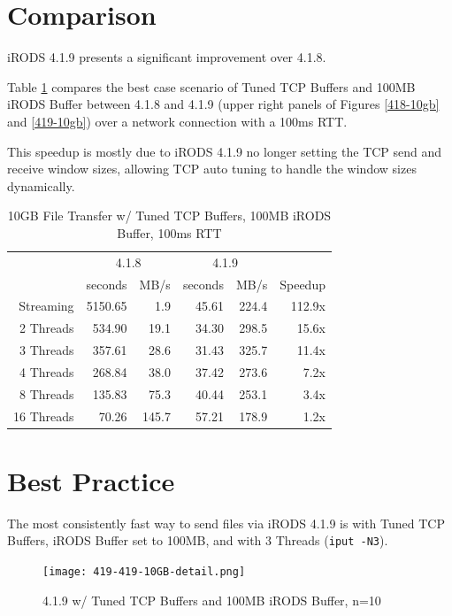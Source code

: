 \documentclass[letter, 11pt]{article}
\begin{document}
\clearpage
\section{Comparison}

iRODS 4.1.9 presents a significant improvement over 4.1.8.

Table \ref{speedup} compares the best case scenario of Tuned TCP Buffers and
100MB iRODS Buffer between 4.1.8 and 4.1.9 (upper right panels of Figures
\ref{418-10gb} and \ref{419-10gb}) over a network connection with a 100ms RTT.

This speedup is mostly due to iRODS 4.1.9 no longer setting the TCP send and receive window sizes, allowing TCP auto tuning
to handle the window sizes dynamically.

\begin{table}[h]
\centering
\begin{tabular}{r|rr|rr|r}
 & \multicolumn{2}{c}{4.1.8} & \multicolumn{2}{c}{4.1.9} & \\
 & seconds & MB/s & seconds & MB/s & Speedup\\
\hline
 Streaming  &  5150.65   &    1.9   &  45.61  &  224.4  &  112.9x \\
 2 Threads  &   534.90   &   19.1   &  34.30  &  298.5  &   15.6x \\
 3 Threads  &   357.61   &   28.6   &  31.43  &  325.7  &   11.4x \\
 4 Threads  &   268.84   &   38.0   &  37.42  &  273.6  &    7.2x \\
 8 Threads  &   135.83   &   75.3   &  40.44  &  253.1  &    3.4x \\
16 Threads  &    70.26   &  145.7   &  57.21  &  178.9  &    1.2x \\

\end{tabular}
\caption{10GB File Transfer w/ Tuned TCP Buffers, 100MB iRODS Buffer, 100ms RTT}
\label{speedup}
\end{table}




\clearpage
\section{Best Practice}

The most consistently fast way to send files via iRODS 4.1.9 is with Tuned TCP Buffers, iRODS Buffer set to 100MB, and
with 3 Threads (\texttt{iput -N3}).

\begin{figure}[h]
    \centering
    \texttt{[image: 419-419-10GB-detail.png]}
    \caption{4.1.9 w/ Tuned TCP Buffers and 100MB iRODS Buffer, n=10}
    \label{best-case}
\end{figure}
\end{document}
